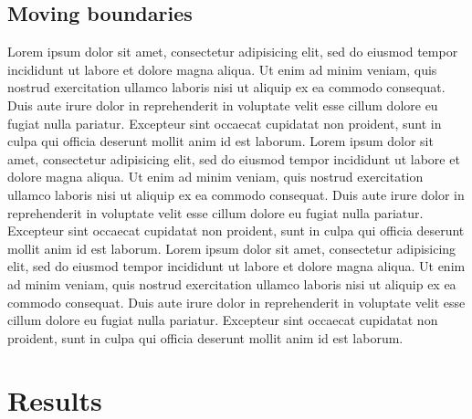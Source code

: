 \documentclass[a0,landscape]{a0poster}
\begin{document}
\begin{multicols}{3}
\subsection*{Moving boundaries}
\color{Black}
Lorem ipsum dolor sit amet, consectetur adipisicing elit, sed do eiusmod
tempor incididunt ut labore et dolore magna aliqua. Ut enim ad minim veniam,
quis nostrud exercitation ullamco laboris nisi ut aliquip ex ea commodo
consequat. Duis aute irure dolor in reprehenderit in voluptate velit esse
cillum dolore eu fugiat nulla pariatur. Excepteur sint occaecat cupidatat non
proident, sunt in culpa qui officia deserunt mollit anim id est laborum.
Lorem ipsum dolor sit amet, consectetur adipisicing elit, sed do eiusmod
tempor incididunt ut labore et dolore magna aliqua. Ut enim ad minim veniam,
quis nostrud exercitation ullamco laboris nisi ut aliquip ex ea commodo
consequat. Duis aute irure dolor in reprehenderit in voluptate velit esse
cillum dolore eu fugiat nulla pariatur. Excepteur sint occaecat cupidatat non
proident, sunt in culpa qui officia deserunt mollit anim id est laborum.
Lorem ipsum dolor sit amet, consectetur adipisicing elit, sed do eiusmod
tempor incididunt ut labore et dolore magna aliqua. Ut enim ad minim veniam,
quis nostrud exercitation ullamco laboris nisi ut aliquip ex ea commodo
consequat. Duis aute irure dolor in reprehenderit in voluptate velit esse
cillum dolore eu fugiat nulla pariatur. Excepteur sint occaecat cupidatat non
proident, sunt in culpa qui officia deserunt mollit anim id est laborum.

% 



\color{Black}
\section*{Results}







\end{multicols}
\end{document}
